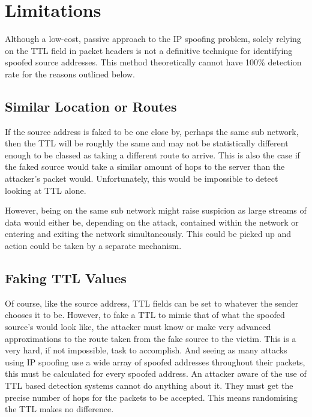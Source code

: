 \documentclass[12pt,twoside]{article}
\begin{document}

\section{Limitations}
Although a low-cost, passive approach to the IP spoofing problem, solely relying on the TTL field in packet headers is not a definitive technique for identifying spoofed source addresses. This method theoretically cannot have 100\% detection rate for the reasons outlined below.

\subsection{Similar Location or Routes} \label{same_routes}
If the source address is faked to be one close by, perhaps the same sub network, then the TTL will be roughly the same and may not be statistically different enough to be classed as taking a different route to arrive. This is also the case if the faked source would take a similar amount of hops to the server than the attacker's packet would. Unfortunately, this would be impossible to detect looking at TTL alone.

However, being on the same sub network might raise suspicion as large streams of data would either be, depending on the attack, contained within the network or entering and exiting the network simultaneously. This could be picked up and action could be taken by a separate mechanism.

\subsection{Faking TTL Values}
Of course, like the source address, TTL fields can be set to whatever the sender chooses it to be. However, to fake a TTL to mimic that of what the spoofed source's would look like, the attacker must know or make very advanced approximations to the route taken from the fake source to the victim. This is a very hard, if not impossible, task to accomplish. And seeing as many attacks using IP spoofing use a wide array of spoofed addresses throughout their packets, this must be calculated for every spoofed address. An attacker aware of the use of TTL based detection systems cannot do anything about it. They must get the precise number of hops for the packets to be accepted. This means randomising the TTL makes no difference.
\end{document}
